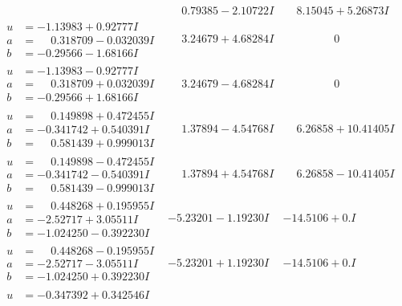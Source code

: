 \documentclass[1p]{elsarticle_modified}
\theoremstyle{definition}
\begin{document}
$$\begin{array}{c|c|c}
 & \phantom{-}0.79385 - 2.10722 I & \phantom{-}8.15045 + 5.26873 I \\ \hline\begin{aligned}
u &= -1.13983 + 0.92777 I \\
a &= \phantom{-}0.318709 - 0.032039 I \\
b &= -0.29566 - 1.68166 I\end{aligned}
 & \phantom{-}3.24679 + 4.68284 I & \phantom{-0.000000 } 0 \\ \hline\begin{aligned}
u &= -1.13983 - 0.92777 I \\
a &= \phantom{-}0.318709 + 0.032039 I \\
b &= -0.29566 + 1.68166 I\end{aligned}
 & \phantom{-}3.24679 - 4.68284 I & \phantom{-0.000000 } 0 \\ \hline\begin{aligned}
u &= \phantom{-}0.149898 + 0.472455 I \\
a &= -0.341742 + 0.540391 I \\
b &= \phantom{-}0.581439 + 0.999013 I\end{aligned}
 & \phantom{-}1.37894 - 4.54768 I & \phantom{-}6.26858 + 10.41405 I \\ \hline\begin{aligned}
u &= \phantom{-}0.149898 - 0.472455 I \\
a &= -0.341742 - 0.540391 I \\
b &= \phantom{-}0.581439 - 0.999013 I\end{aligned}
 & \phantom{-}1.37894 + 4.54768 I & \phantom{-}6.26858 - 10.41405 I \\ \hline\begin{aligned}
u &= \phantom{-}0.448268 + 0.195955 I \\
a &= -2.52717 + 3.05511 I \\
b &= -1.024250 - 0.392230 I\end{aligned}
 & -5.23201 - 1.19230 I & -14.5106 + 0. I\phantom{ +0.000000I} \\ \hline\begin{aligned}
u &= \phantom{-}0.448268 - 0.195955 I \\
a &= -2.52717 - 3.05511 I \\
b &= -1.024250 + 0.392230 I\end{aligned}
 & -5.23201 + 1.19230 I & -14.5106 + 0. I\phantom{ +0.000000I} \\ \hline\begin{aligned}
u &= -0.347392 + 0.342546 I \\

\end{aligned}
\end{array}$$
\end{document}
